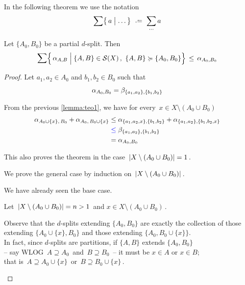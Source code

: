 \documentclass[./main.tex]{subfiles}
\begin{document}
In the following theorem we use the notation
\[ \sum \bigl\{\, a \mathrel{\big|} \dots \bigr\}\ \defeq\ \sum_{\cdots} a \nospblw \] \vspace{-\baselineskip}

\begin{theorem}[{\cites[Theorem 1]{BD92a}}] \label{teo:teo1}
    Let $\{A_0,B_0\}$ be a partial $d$-split. Then
    \[ \mathlarger{\sum} \Bigl\{\, \aAB \mathrel{\Big|} \{A,B\} \in \Sc(X) \,,\ \{A,B\} \succcurlyeq \{A_0,B_0\} \Bigr\} \,\leq\, \alpha_{A_0,B_0} \nospblw \]
\end{theorem}
\begin{proof}
    Let $a_1,a_2 \in A_0$ and $b_1,b_2 \in B_0$ such that 
    \[ \alpha_{A_0,B_0} = \beta_{\{a_1,a_2\},\{b_1,b_2\}} \nospblw \]
    
    From the previous \autoref{lemma:teo1}, we have for every $\, x \in X \setminus (A_0 \cup B_0)$
    \begin{align*}
        \alpha_{A_0 \cup \{x\},\, B_0} + \alpha_{A_0,\, B_0 \cup \{x\}} &\leq \alpha_{\{a_1,a_2,x\},\{b_1,b_2\}} + \alpha_{\{a_1,a_2\},\{b_1,b_2,x\}} \\
        &\mathcolor{blue}{\leq} \beta_{\{a_1,a_2\},\{b_1,b_2\}} \\
        &= \alpha_{A_0,B_0}
    \end{align*}
    
    This also proves the theorem in the case $\, \left\lvert X \setminus (A_0 \cup B_0)\right\rvert = 1 \,$. \bigskip
    
    We prove the general case by induction on $\, \left\lvert X \setminus (A_0 \cup B_0)\right\rvert \,$.
    
    We have already seen the base case.
    
    Let $\, \left\lvert X \setminus (A_0 \cup B_0)\right\rvert = n > 1 \,$ and $x \in X \setminus (A_0 \cup B_0) \,$.

    \begin{spacing}{1.1}
    Observe that the $d$-splits extending $\{A_0,B_0\}$ are exactly the collection of those extending $\bigl\{ A_0 \cup \{x\}, B_0 \bigr\}$ and those extending $\bigl\{ A_0, B_0 \cup \{x\} \bigr\}$. \\[2pt]
    In fact, since $d$-splits are partitions, if $\{A,B\}$ extends $\{A_0,B_0\}$ \\
    -- say WLOG $\, A \supseteq A_0 \,$ and $\, B \supseteq B_0 \,$ -- it must be $x \in A$ or $x \in B$; \\
    that is $\, A \supseteq A_0 \cup \{x\} \,$ or $\, B \supseteq B_0 \cup \{x\} \,$.
    \end{spacing}


\end{proof}
\end{document}
